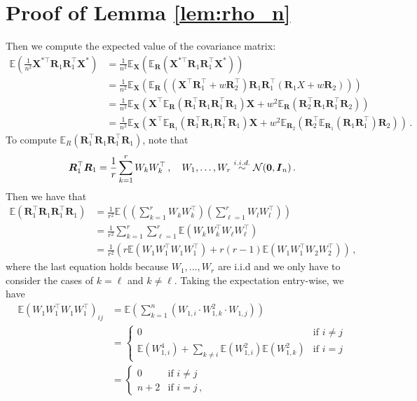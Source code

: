 \documentclass[11pt]{article}
\newcommand{\bX}{\boldsymbol{X}}
\newcommand{\bI}{\boldsymbol{I}}
\newcommand{\bR}{\boldsymbol{R}}
\newcommand{\mcN}{\mathcal{N}}
\newcommand{\Expected}{\mathbb{E}}
\begin{document}
\section{Proof of Lemma \ref{lem:rho_n}}\label{pf:rho_n}
Then we compute the expected value of the covariance matrix: 
\begin{align*}
    \Expected\left(\frac{1}{n^2}\bX^{*\top}\bR_1\bR_1^\top\bX^*\right) &= \frac{1}{n^2} \Expected_{\bX}\left(\Expected_{\bR}\left(\bX^{*\top}\bR_1\bR_1^\top\bX^*\right)\right)\\
        &= \frac{1}{n^2}\Expected_{\bX}(\Expected_{\bR}((\bX^\top \bR_1^\top+w\bR_2^\top)\bR_1\bR_1^\top(\bR_1X+w\bR_2)))\\
        &=  \frac{1}{n^2}\Expected_{\bX}(\bX^\top \Expected_{\bR}(\bR_1^\top \bR_1 \bR_1^\top \bR_1)\bX+w^2\Expected_{\bR}(\bR_2^\top \bR_1 \bR_1^\top \bR_2))\\
        &=  \frac{1}{n^2}\Expected_{\bX}(\bX^\top \Expected_{\bR_1}(\bR_1^\top \bR_1 \bR_1^\top \bR_1)\bX+w^2\Expected_{\bR_2}(\bR_2^\top \Expected_{\bR_1}(\bR_1 \bR_1^\top) \bR_2))\,.
\end{align*}
To compute $\Expected_R(\bR_1^\top \bR_1 \bR_1^\top \bR_1)$, note that 
\begin{equation}\label{eq:rho-eq1}
    \bR_1^\top \bR_1 = \frac{1}{r}\sum_{k =1}^rW_kW_k^\top\,,\quad W_1,\dotsc,W_r\stackrel{i.i.d.}{\sim}\mcN({{\bf{0}}},\bI_n)\,.
\end{equation}
Then we have that
\begin{align*}
    \Expected(\bR_1^\top \bR_1 \bR_1^\top \bR_1) &=  \frac{1}{r^2}\Expected\left(\left(\sum_{k=1}^r W_kW_k^\top\right)\left( \sum_{\ell=1}^rW_lW_l^\top\right)\right)\\
        &= \frac{1}{r^2}\sum_{k=1}^r\sum_{\ell=1}^r\Expected\left(W_kW_k^\top W_{\ell} W_{\ell}^\top\right)\\
        &= \frac{1}{r^2}\left(r\Expected(W_1W_1^\top W_1W_1^\top)+r(r-1)\Expected(W_1W_1^\top W_2W_2^\top)\right)\,,
\end{align*}
where the last equation holds because $W_1,\dotsc,W_r$ are i.i.d and we only have to consider the cases of $k=\ell$ and $k\neq \ell$. Taking the expectation entry-wise, we have
\begin{align}\label{eq:rho-eq2}
    \Expected\left(W_1W_1^\top W_1W_1^\top\right)_{ij} &= \Expected\left(\sum_{k=1}^n (W_{1,i}\cdot W_{1,k}^2\cdot W_{1,j})\right)\nonumber\\
        &= \begin{cases}
            0 & \text{if }i\neq j\\
            \Expected(W_{1,i}^4)+\sum_{k\neq i}\Expected(W_{1,i}^2)\Expected(W_{1,k}^2) & \text{if }i=j
        \end{cases}\nonumber \\
        &= \begin{cases}
            0 & \text{if }i\neq j\\
            n+2 & \text{if }i=j\,,
        \end{cases}
\end{align}
\end{document}
